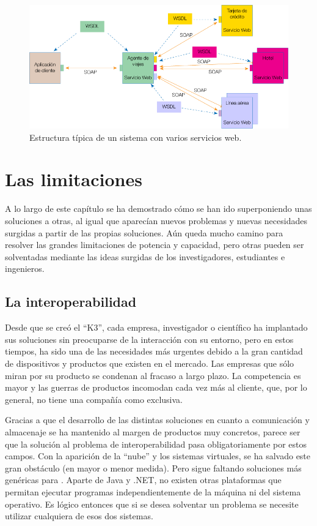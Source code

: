 \begin{figure}
	\centering
	\includegraphics[scale=0.55]{images/serviciosweb.png}
	\caption[Servicios web]{Estructura típica de un sistema con varios servicios web.}
	\label{fig:serviciosweb}
\end{figure}

\section{Las limitaciones}
A lo largo de este capítulo se ha demostrado cómo se han ido 
superponiendo unas soluciones a otras, al igual que aparecían nuevos 
problemas y nuevas necesidades surgidas a partir de las propias 
soluciones. Aún queda mucho camino para resolver las grandes 
limitaciones de potencia y capacidad, pero otras pueden ser 
solventadas mediante las ideas surgidas de los investigadores, 
estudiantes e ingenieros.

\subsection{La interoperabilidad  
}
Desde que se creó el ``K3'', cada empresa, investigador o científico 
ha implantado sus soluciones sin preocuparse de la interacción con su 
entorno, pero en estos tiempos, ha sido una de las necesidades más 
urgentes debido a la gran cantidad de dispositivos y productos que 
existen en el mercado. Las empresas que sólo miran por su producto se 
condenan al fracaso a largo plazo. La competencia es mayor y 
las guerras de productos incomodan cada vez más al cliente, que, por lo 
general, no tiene una compañía como exclusiva.

Gracias a que el desarrollo de las distintas soluciones en cuanto a 
comunicación y almacenaje se ha mantenido al margen de productos muy 
concretos, parece ser que la solución al problema de interoperabilidad 
pasa obligatoriamente por estos campos. Con la aparición de la 
``nube'' y los sistemas virtuales, se ha salvado este gran obstáculo 
(en mayor o menor medida). Pero sigue faltando soluciones más 
genéricas para \software . Aparte de Java y .NET, no existen otras 
plataformas que permitan ejecutar programas independientemente de la 
máquina ni del sistema operativo. Es lógico entonces que si se desea 
solventar un problema se necesite utilizar cualquiera de esos dos sistemas.

